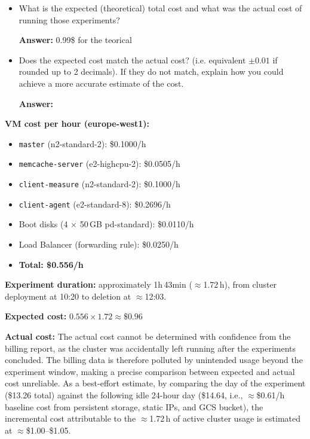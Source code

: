 \begin{enumerate}[label=(\alph*)]
\begin{itemize}
        \item What is the expected (theoretical) total cost and what was the actual cost of running those experiments?
   
        \textbf{Answer:} 0.99\$ for the teorical %
        \\

        \item Does the expected cost match the actual cost? (i.e. equivalent $\pm 0.01$ if rounded up to 2 decimals). If they do not match, explain how you could achieve a more accurate estimate of the cost.
        
        \textbf{Answer:}  %
    \end{itemize}



            
\end{enumerate}
\textbf{VM cost per hour (europe-west1):}
\begin{itemize}
  \item \texttt{master} (n2-standard-2): \$0.1000/h
  \item \texttt{memcache-server} (e2-highcpu-2): \$0.0505/h
  \item \texttt{client-measure} (n2-standard-2): \$0.1000/h
  \item \texttt{client-agent} (e2-standard-8): \$0.2696/h
  \item Boot disks (4 $\times$ 50\,GB pd-standard): \$0.0110/h
  \item Load Balancer (forwarding rule): \$0.0250/h
  \item \textbf{Total: \$0.556/h}
\end{itemize}

\textbf{Experiment duration:} approximately 1h\,43min ($\approx$1.72\,h),
from cluster deployment at 10:20 to deletion at $\approx$12:03.

\textbf{Expected cost:} $0.556 \times 1.72 \approx \$0.96$

\textbf{Actual cost:} The actual cost cannot be determined with confidence 
from the billing report, as the cluster was accidentally left running after 
the experiments concluded. The billing data is therefore polluted by 
unintended usage beyond the experiment window, making a precise comparison 
between expected and actual cost unreliable. As a best-effort estimate, 
by comparing the day of the experiment (\$13.26 total) against the 
following idle 24-hour day (\$14.64, i.e., $\approx$\$0.61/h baseline cost 
from persistent storage, static IPs, and GCS bucket), the incremental cost 
attributable to the $\approx$1.72\,h of active cluster usage is estimated 
at $\approx$\$1.00--\$1.05.

